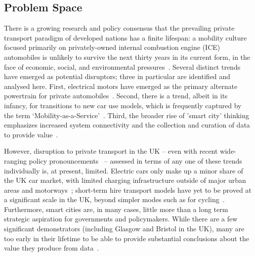 \documentclass[b5paper,10pt]{article}
\begin{document}
\subsection{Problem Space}

There is a growing research and policy consensus that the prevailing
private transport paradigm of developed nations has a finite lifespan:
a mobility culture focused primarily on privately-owned internal
combustion engine (ICE) automobiles is unlikely to survive the next
thirty years in its current form, in the face of economic, social, and
environmental
pressures~\citep{lerner:2011,van-audenhove-et-al:2014,black-et-al:2016}.
Several distinct trends have emerged as potential disruptors; three in
particular are identified and analysed here. First, electrical motors
have emerged as the primary alternate powertrain for private
automobiles~\citep{paffumi-et-al:2015,gnann-et-al:2015}.  Second,
there is a trend, albeit in its infancy, for transitions to new car
use models, which is frequently captured by the term
`Mobility-as-a-Service'~\citep{tscatapult:2016}. Third, the broader
rise of 'smart city' thinking emphasizes increased system connectivity
and the collection and curation of data to provide
value~\citep{townsend:2013,cosgrave-et-al:2013,ibm:2014}.

However, disruption to private transport in the UK -- even with recent
wide-ranging policy pronouncements~\citep{bbcnews:2017} -- assessed in
terms of any one of these trends individually is, at present,
limited. Electric cars only make up a minor share of the UK car
market, with limited charging infrastructure outside of major urban
areas and motorways~\citep{brook:2015}; short-term hire transport
models have yet to be proved at a significant scale in the UK, beyond
simpler modes such as for
cycling~\citep{kamargianni-et-al:2016}. Furthermore, smart cities are,
in many cases, little more than a long term strategic aspiration for
governments and policymakers. While there are a few significant
demonstrators (including Glasgow and Bristol in the UK), many are too
early in their lifetime to be able to provide substantial conclusions
about the value they produce from
data~\citep{ojo-et-al:2015,sta:2017}.
\end{document}
